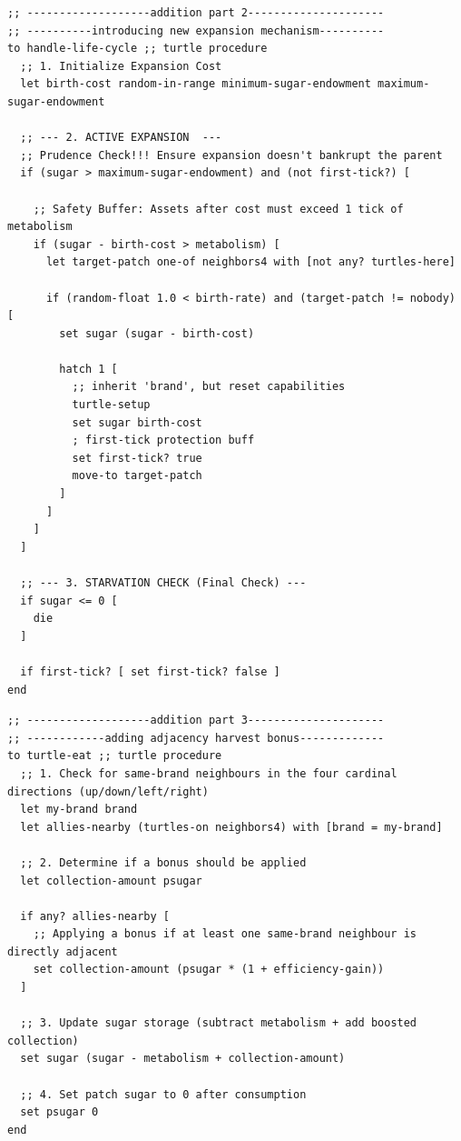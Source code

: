 \documentclass{article}
\begin{document}
\begin{lstlisting}[language=NetLogo, caption={Introduction of new expansion mechanism}]
;; -------------------addition part 2---------------------
;; ----------introducing new expansion mechanism----------
to handle-life-cycle ;; turtle procedure
  ;; 1. Initialize Expansion Cost
  let birth-cost random-in-range minimum-sugar-endowment maximum-sugar-endowment
  
  ;; --- 2. ACTIVE EXPANSION  ---
  ;; Prudence Check!!! Ensure expansion doesn't bankrupt the parent 
  if (sugar > maximum-sugar-endowment) and (not first-tick?) [
    
    ;; Safety Buffer: Assets after cost must exceed 1 tick of metabolism
    if (sugar - birth-cost > metabolism) [
      let target-patch one-of neighbors4 with [not any? turtles-here]
      
      if (random-float 1.0 < birth-rate) and (target-patch != nobody) [
        set sugar (sugar - birth-cost)
        
        hatch 1 [
          ;; inherit 'brand', but reset capabilities 
          turtle-setup      
          set sugar birth-cost
          ; first-tick protection buff
          set first-tick? true
          move-to target-patch
        ]
      ]
    ]
  ]
  
  ;; --- 3. STARVATION CHECK (Final Check) ---
  if sugar <= 0 [
    die 
  ]
  
  if first-tick? [ set first-tick? false ]
end
\end{lstlisting}



\begin{lstlisting}[language=NetLogo, caption={Addition of adjacency harvest bonus}]
;; -------------------addition part 3---------------------
;; ------------adding adjacency harvest bonus-------------
to turtle-eat ;; turtle procedure
  ;; 1. Check for same-brand neighbours in the four cardinal directions (up/down/left/right)
  let my-brand brand
  let allies-nearby (turtles-on neighbors4) with [brand = my-brand]
  
  ;; 2. Determine if a bonus should be applied
  let collection-amount psugar
  
  if any? allies-nearby [
    ;; Applying a bonus if at least one same-brand neighbour is directly adjacent
    set collection-amount (psugar * (1 + efficiency-gain))
  ]
  
  ;; 3. Update sugar storage (subtract metabolism + add boosted collection)
  set sugar (sugar - metabolism + collection-amount)
  
  ;; 4. Set patch sugar to 0 after consumption
  set psugar 0
end
\end{lstlisting}
\end{document}
